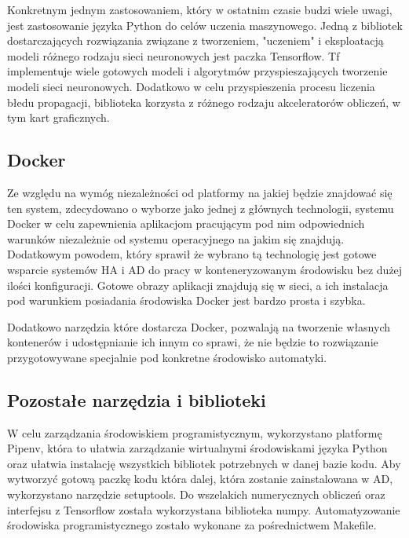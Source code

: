 Konkretnym jednym zastosowaniem, który w ostatnim czasie budzi wiele uwagi, jest zastosowanie języka Python do celów uczenia maszynowego. Jedną z bibliotek dostarczających rozwiązania związane z tworzeniem, "uczeniem" i eksploatacją modeli różnego rodzaju sieci neuronowych jest paczka Tensorflow. Tf implementuje wiele gotowych modeli i algorytmów przyspieszających tworzenie modeli sieci neuronowych. Dodatkowo w celu przyspieszenia procesu liczenia błedu propagacji, biblioteka korzysta z różnego rodzaju akceleratorów obliczeń, w tym kart graficznych.

\subsection{Docker}
Ze względu na wymóg niezależności od platformy na jakiej będzie znajdować się ten system, zdecydowano o wyborze jako jednej z głównych technologii, systemu Docker w celu zapewnienia aplikacjom pracującym pod nim odpowiednich warunków niezależnie od systemu operacyjnego na jakim się znajdują. Dodatkowym powodem, który sprawił że wybrano tą technologię jest gotowe wsparcie systemów HA i AD do pracy w konteneryzowanym środowisku bez dużej ilości konfiguracji. Gotowe obrazy aplikacji znajdują się w sieci, a ich instalacja pod warunkiem posiadania środowiska Docker jest bardzo prosta i szybka.

Dodatkowo narzędzia które dostarcza Docker, pozwalają na tworzenie własnych kontenerów i udostępnianie ich innym co sprawi, że nie będzie to rozwiązanie przygotowywane specjalnie pod konkretne środowisko automatyki.

\subsection{Pozostałe narzędzia i biblioteki}
W celu zarządzania środowiskiem programistycznym, wykorzystano platformę Pipenv, która to ułatwia zarządzanie wirtualnymi środowiskami języka Python oraz ułatwia instalację wszystkich bibliotek potrzebnych w danej bazie kodu. Aby wytworzyć gotową paczkę kodu która dalej, która zostanie zainstalowana w AD, wykorzystano narzędzie setuptools. Do wszelakich numerycznych obliczeń oraz interfejsu z Tensorflow została wykorzystana biblioteka numpy. Automatyzowanie środowiska programistycznego zostało wykonane za pośrednictwem Makefile.


